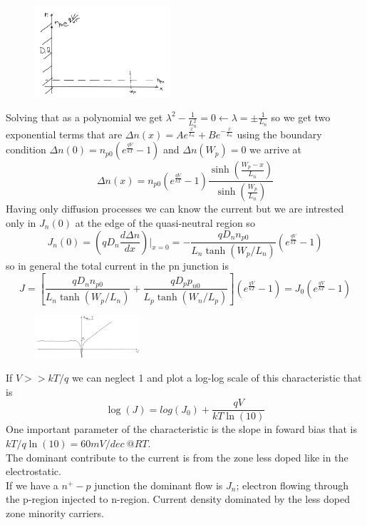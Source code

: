\begin{figure}
\includegraphics[width=0.45\textwidth]{pn10.png}
\end{figure}

Solving that as a polynomial we get $\lambda^2-\frac{1}{L_n^2}=0\leftarrow \lambda=\pm\frac{1}{L_n}$ so we get two exponential terms that are $\Delta n(x)=Ae^{\frac{x}{L_n}}+Be^{-\frac{x}{L_n}}$ using the boundary condition $\Delta n(0)=n_{p0}(e^{\frac{qV}{kT}}-1)$ and $\Delta n(W_p)=0$ we arrive at
\begin{equation}
\Delta n(x)=n_{p0}(e^{\frac{qV}{kT}}-1)\frac{\sinh(\frac{W_p-x}{L_n})}{\sinh(\frac{W_p}{L_n})}
\end{equation}
Having only diffusion processes we can know the current but we are intrested only in $J_n(0)$ at the edge of the quasi-neutral region so 
\begin{equation}
J_n(0)=(qD_n \frac{d\Delta n}{dx})|_{x=0}=-\frac{qD_nn_{p0}}{L_n\tanh(W_p/L_n)}(e^{\frac{qV}{kT}}-1)
\end{equation}
so in general the total current in the pn junction is 
\begin{equation}
J=[\frac{qD_nn_{p0}}{L_n\tanh(W_p/L_n)}+\frac{qD_pp_{n0}}{L_p\tanh(W_n/L_p)}](e^{\frac{qV}{kT}}-1)=J_0(e^{\frac{qV}{kT}}-1)
\end{equation}

\begin{figure}
\includegraphics[width=0.35\textwidth]{pn11.png}
\end{figure}


If $V>>kT/q$ we can neglect 1 and plot a log-log scale of this characteristic that is 
\begin{equation}
\log(J)=log(J_0)+\frac{qV}{kT\ln(10)}
\end{equation}
One important parameter of the characteristic is the slope in foward bias that is $kT/q \ln(10)=60mV/dec \ @RT$.\\
\vspace{5mm}
The dominant contribute to the current is from the zone less doped like in the electrostatic.\\
If we have a $n^+-p$ junction the dominant flow is $J_n$; electron flowing through the p-region injected to n-region. Current density dominated by the less doped zone minority carriers.

